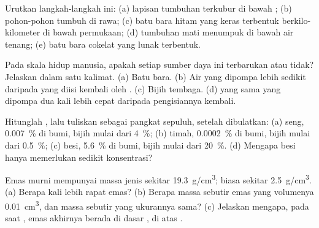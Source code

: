 \begin{exercise}[$\star$]\label{exo:g9:earth-resources:3}
Urutkan langkah-langkah ini: (a) lapisan tumbuhan terkubur di bawah 
; (b) pohon-pohon tumbuh di rawa; (c) batu bara hitam yang keras
terbentuk berkilo-kilometer di bawah permukaan; (d) tumbuhan mati
menumpuk di bawah air tenang; (e) batu bara cokelat yang lunak terbentuk.
\end{exercise}

\begin{exercise}[$\star$]\label{exo:g9:earth-resources:4}
Pada skala hidup manusia, apakah setiap sumber daya ini terbarukan atau
tidak? Jelaskan dalam satu kalimat. (a) Batu bara. (b) Air  yang
dipompa lebih sedikit daripada yang diisi kembali oleh . (c) Bijih
tembaga. (d)  yang sama yang dipompa dua kali lebih cepat daripada
pengisiannya kembali.
\end{exercise}

\begin{exercise}[$\star\star$]\label{exo:g9:earth-resources:5}
Hitunglah , lalu tuliskan sebagai pangkat sepuluh,
setelah dibulatkan: (a) seng, \qty{0.007}{\%} di  bumi, bijih mulai
dari \qty{4}{\%}; (b) timah, \qty{0.0002}{\%} di  bumi, bijih mulai
dari \qty{0.5}{\%}; (c) besi, \qty{5.6}{\%} di  bumi, bijih mulai
dari \qty{20}{\%}. (d) Mengapa besi hanya memerlukan sedikit konsentrasi?
\end{exercise}

\begin{exercise}[$\star\star$]\label{exo:g9:earth-resources:6}
Emas murni mempunyai massa jenis sekitar \qty{19.3}{g/cm^3};  biasa
sekitar \qty{2.5}{g/cm^3}. (a) Berapa kali lebih rapat emas? (b) Berapa
massa sebutir emas yang volumenya \qty{0.01}{cm^3}, dan massa sebutir
 yang ukurannya sama? (c) Jelaskan mengapa, pada saat , emas
akhirnya berada di dasar , di atas .
\end{exercise}

